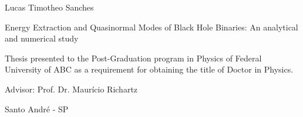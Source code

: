 \documentclass[12pt, twoside]{report}
\begin{document}


\begin{center}
  Lucas Timotheo Sanches
  \par\end{center}

\vspace{2.5cm}


\begin{center}
  {\huge{}Energy Extraction and Quasinormal Modes of Black Hole Binaries: An analytical and numerical study}{\huge\par}
  \par\end{center}

\begin{center}
  \vspace{2.5cm}
  \par\end{center}


\begin{center}
  \begin{minipage}[t]{0.6\columnwidth}
    \begin{center}
      Thesis presented to the Post-Graduation program in Physics of
      Federal University of ABC as a requirement for obtaining the title
      of Doctor in Physics.
      \par\end{center}
  \end{minipage}
  \par\end{center}


\begin{center}
  \vspace{2cm}
  Advisor: Prof. Dr. Maurício Richartz
  \par\end{center}


\begin{center}
  \vspace{2cm}
  Santo André - SP
  \par\end{center}
\end{document}
